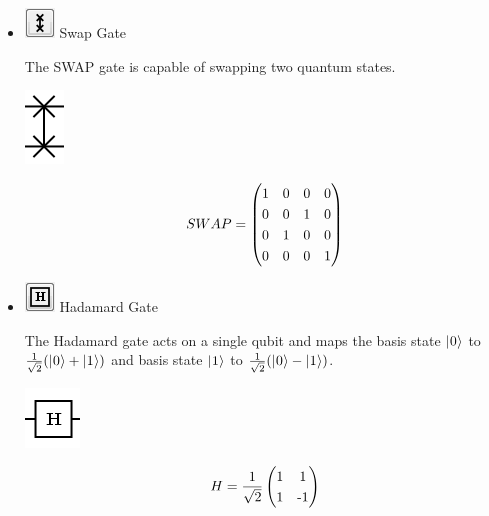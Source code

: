 \documentclass[10pt]{article}
\theoremstyle{definition}
\newcommand{\microspace}{\mspace{0.5mu}}
\def \lket {\left|}
\def \rket {\right\rangle}
\newcommand{\ket}[1]{\lket\microspace #1 \microspace\rket}
\begin{document}
\begin{itemize}
\item \includegraphics{Figures/Gates/SwapGate.png}  Swap Gate

The SWAP gate is capable of swapping two quantum states.

\begin{center}
\includegraphics[scale=.7]{Figures/Gates/SwapGateViewer} \\
  \begin{minipage}{.9\linewidth}
    \begin{equation*} \label{mat:Swap}
    \renewcommand{\arraystretch}{1.25}
SWAP = \begin{pmatrix} 1 & 0 & 0 & 0 \\ 0 & 0 & 1 & 0 \\ 0 & 1 & 0 & 0 \\ 0 & 0 & 0 & 1\end{pmatrix}
    \end{equation*}
  \end{minipage}\hspace{-2.5cm}
  \begin{minipage}{.2\linewidth}
  \vspace*{3pt}
  \end{minipage}
\end{center}

\item \includegraphics{Figures/Gates/Hadamard.png}  Hadamard Gate

The Hadamard gate acts on a single qubit and maps the basis state $\ket{0}$ to $\frac{1}{\sqrt 2}(\ket{0} + \ket{1})$ and basis state $\ket{1}$ to $\frac{1}{\sqrt 2}(\ket{0} - \ket{1})$. 

\begin{center}
\includegraphics[scale=.7]{Figures/Gates/HadamardViewer} \\
  \vspace*{3pt}
  \begin{minipage}{.9\linewidth}
    \begin{equation*} \label{mat:Hadamard}
    \renewcommand{\arraystretch}{1.25}
H =  \frac{1}{\sqrt 2}\begin{pmatrix} 1 & 1 \\ 1 & \textnormal{-}1 \end{pmatrix}
    \end{equation*}
  \end{minipage}\hspace{-2.5cm}
\end{center}


\end{itemize}
\end{document}
